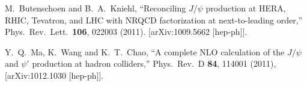 \documentclass[aps,prc,preprint,superscriptaddress,showpacs,showkeys,amsmath]{revtex4-1}
\begin{document}
\begin{thebibliography}{100}
  M.~Butenschoen and B.~A.~Kniehl,
  ``Reconciling $J/\psi$ production at HERA, RHIC, Tevatron, and LHC with NRQCD factorization at next-to-leading order,''
  Phys.\ Rev.\ Lett.\  {\bf 106}, 022003 (2011). 
[arXiv:1009.5662 [hep-ph]].
 

  Y.~Q.~Ma, K.~Wang and K.~T.~Chao,
  ``A complete NLO calculation of the $J/\psi$ and $\psi'$ production at hadron colliders,''
  Phys.\ Rev.\ D {\bf 84}, 114001 (2011),
  [arXiv:1012.1030 [hep-ph]].




\end{thebibliography}
\end{document}
